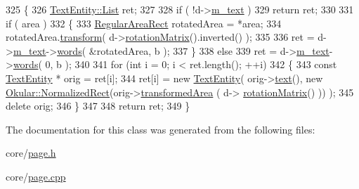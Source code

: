 \begin{DoxyCode}
325 \{
326     \hyperlink{classQList}{TextEntity::List} ret;
327 
328     \textcolor{keywordflow}{if} ( !d->\hyperlink{classOkular_1_1PagePrivate_a4cec09776018bc9ba579c2621dc0dbb6}{m\_text} )
329         \textcolor{keywordflow}{return} ret;
330 
331     \textcolor{keywordflow}{if} ( area )
332     \{
333         \hyperlink{classOkular_1_1RegularAreaRect}{RegularAreaRect} rotatedArea = *area;
334         rotatedArea.\hyperlink{classOkular_1_1RegularArea_a38570778d6e7f984a3b3b7724e69ab10}{transform}( d->\hyperlink{classOkular_1_1PagePrivate_a87e2009afc3a1f31a0b03d3a6a359a03}{rotationMatrix}().inverted() );
335 
336         ret = d->\hyperlink{classOkular_1_1PagePrivate_a4cec09776018bc9ba579c2621dc0dbb6}{m\_text}->\hyperlink{classOkular_1_1TextPage_a4cebdb9719013a6aac4c2000d244ed93}{words}( &rotatedArea, b );
337     \}
338     \textcolor{keywordflow}{else}
339         ret = d->\hyperlink{classOkular_1_1PagePrivate_a4cec09776018bc9ba579c2621dc0dbb6}{m\_text}->\hyperlink{classOkular_1_1TextPage_a4cebdb9719013a6aac4c2000d244ed93}{words}( 0, b );
340 
341     \textcolor{keywordflow}{for} (\textcolor{keywordtype}{int} i = 0; i < ret.length(); ++i)
342     \{
343         \textcolor{keyword}{const} \hyperlink{classOkular_1_1TextEntity}{TextEntity} * orig = ret[i];
344         ret[i] = \textcolor{keyword}{new} \hyperlink{classOkular_1_1TextEntity}{TextEntity}( orig->\hyperlink{classOkular_1_1TextEntity_a401ca5d9c54d5e25bd3c8a7ce7b7092b}{text}(), \textcolor{keyword}{new} 
      \hyperlink{classOkular_1_1NormalizedRect}{Okular::NormalizedRect}(orig->\hyperlink{classOkular_1_1TextEntity_abfd46cc1666c7af2c86a976916942a28}{transformedArea} ( d->
      \hyperlink{classOkular_1_1PagePrivate_a87e2009afc3a1f31a0b03d3a6a359a03}{rotationMatrix}() )) );
345         \textcolor{keyword}{delete} orig;
346     \}
347 
348     \textcolor{keywordflow}{return} ret;
349 \}
\end{DoxyCode}


The documentation for this class was generated from the following files\+:\begin{DoxyCompactItemize}
\item 
core/\hyperlink{page_8h}{page.\+h}\item 
core/\hyperlink{page_8cpp}{page.\+cpp}\end{DoxyCompactItemize}
